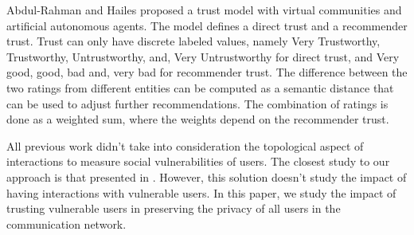Abdul-Rahman and Hailes \cite{abdul-rahman_supporting_2000}
	proposed a trust model with virtual communities and artificial autonomous agents.
The model defines a direct trust and a recommender trust.
Trust can only have discrete labeled values,
	namely Very Trustworthy,
	Trustworthy,
	Untrustworthy,
	and,
	Very Untrustworthy for direct trust,
	and Very good,
	good,
	bad and,
	very bad for recommender trust.
The difference between the two ratings from different entities can be computed as a semantic distance that can be used to adjust further recommendations.
The combination of ratings is done as a weighted sum,
	where the weights depend on the recommender trust.


All previous work didn't take into consideration the topological aspect of interactions to measure social vulnerabilities of users.
The closest study to our approach is that presented in \cite{zeng_trustaware_2014}.
However,
	this solution doesn't study the impact of having interactions with vulnerable users.
In this paper,
	we study the impact of trusting vulnerable users in preserving the privacy of all users in the communication network.

